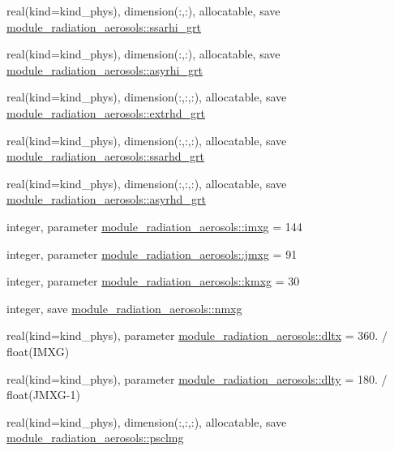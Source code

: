 \begin{DoxyCompactItemize}
\item 
real(kind=kind\+\_\+phys), dimension(\+:,\+:), allocatable, save \hyperlink{namespacemodule__radiation__aerosols_ae8587d9b4ebd9cf5d363a82d15049324}{module\+\_\+radiation\+\_\+aerosols\+::ssarhi\+\_\+grt}
\item 
real(kind=kind\+\_\+phys), dimension(\+:,\+:), allocatable, save \hyperlink{namespacemodule__radiation__aerosols_a4b5f80817af9f2116618d6c8f0e194de}{module\+\_\+radiation\+\_\+aerosols\+::asyrhi\+\_\+grt}
\item 
real(kind=kind\+\_\+phys), dimension(\+:,\+:,\+:), allocatable, save \hyperlink{namespacemodule__radiation__aerosols_a07bfe1ada075519d1d3ceabe21b65a96}{module\+\_\+radiation\+\_\+aerosols\+::extrhd\+\_\+grt}
\item 
real(kind=kind\+\_\+phys), dimension(\+:,\+:,\+:), allocatable, save \hyperlink{namespacemodule__radiation__aerosols_a4aa91ab1d0b9d71c704dc565ef4704bf}{module\+\_\+radiation\+\_\+aerosols\+::ssarhd\+\_\+grt}
\item 
real(kind=kind\+\_\+phys), dimension(\+:,\+:,\+:), allocatable, save \hyperlink{namespacemodule__radiation__aerosols_a2da45b8bd425415ca417f6590cc54da6}{module\+\_\+radiation\+\_\+aerosols\+::asyrhd\+\_\+grt}
\item 
integer, parameter \hyperlink{namespacemodule__radiation__aerosols_aa7b2e0e1d0669af4efc75cb32301f1f1}{module\+\_\+radiation\+\_\+aerosols\+::imxg} = 144
\item 
integer, parameter \hyperlink{namespacemodule__radiation__aerosols_a816ee06781e63adf8752a9a67ab2da2d}{module\+\_\+radiation\+\_\+aerosols\+::jmxg} = 91
\item 
integer, parameter \hyperlink{namespacemodule__radiation__aerosols_a5339e589d92fab8cbb310b84b6ca3d9e}{module\+\_\+radiation\+\_\+aerosols\+::kmxg} = 30
\item 
integer, save \hyperlink{namespacemodule__radiation__aerosols_adb4c4cdc8e3212777229d1f54e79bb05}{module\+\_\+radiation\+\_\+aerosols\+::nmxg}
\item 
real(kind=kind\+\_\+phys), parameter \hyperlink{namespacemodule__radiation__aerosols_a084315fde4afcad23cd3aeb18a4d8a4e}{module\+\_\+radiation\+\_\+aerosols\+::dltx} = 360. / float(I\+M\+XG)
\item 
real(kind=kind\+\_\+phys), parameter \hyperlink{namespacemodule__radiation__aerosols_a499bb3c75e9802c5ee7fd6cdb6660f7e}{module\+\_\+radiation\+\_\+aerosols\+::dlty} = 180. / float(J\+M\+XG-\/1)
\item 
real(kind=kind\+\_\+phys), dimension(\+:,\+:,\+:), allocatable, save \hyperlink{namespacemodule__radiation__aerosols_a942aa3a9f61cb40592bd0879a91c2ede}{module\+\_\+radiation\+\_\+aerosols\+::psclmg}

\end{DoxyCompactItemize}
